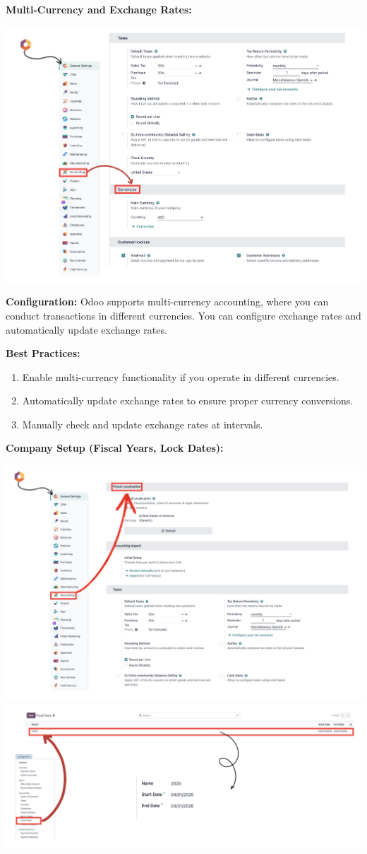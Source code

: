 \documentclass[11pt,a4paper]{article}
\begin{document}
\newpage
\noindent\textbf{Multi-Currency and Exchange Rates:}
\begin{center}
    \includegraphics[width=0.8\linewidth]{diagram/Currency.png}
\end{center}

\noindent\textbf{Configuration:} Odoo supports multi-currency accounting, where you can conduct transactions in 
different currencies. You can configure exchange rates and automatically update exchange rates.
\medskip

\noindent\textbf{Best Practices:}
\begin{enumerate}
    \item Enable multi-currency functionality if you operate in different currencies.
    \item Automatically update exchange rates to ensure proper currency conversions.
    \item Manually check and update exchange rates at intervals.
\end{enumerate}

\newpage
\noindent\textbf{Company Setup (Fiscal Years, Lock Dates):}
\begin{center}
    \includegraphics[width=0.8\linewidth]{diagram/Fiscal_Localization.png}
    \includegraphics[width=0.8\linewidth]{diagram/Fiscal_year.png}
\end{center}
\end{document}
